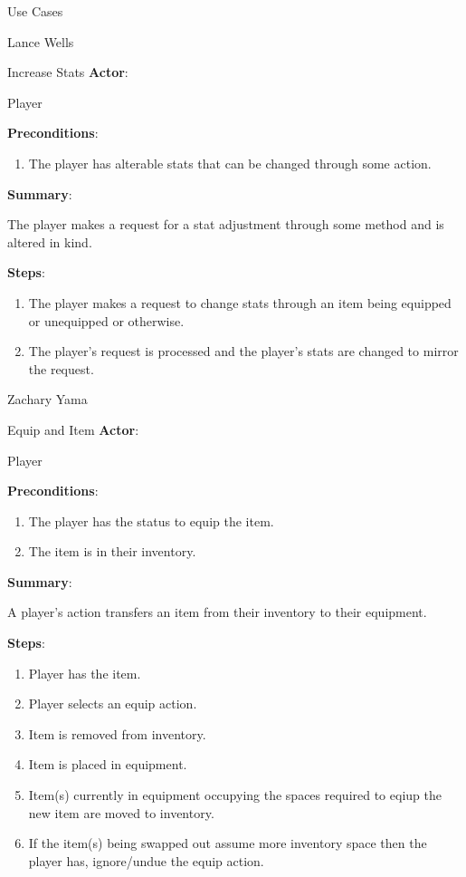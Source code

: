 \documentclass[12pt]{report}
\begin{document}
\begin{section}{Use Cases}
\begin{subsection}{Lance Wells}
\begin{subsubsection}{Increase Stats}
\textbf{Actor}:

Player

\textbf{Preconditions}:

\begin{enumerate}
\item The player has alterable stats that can be changed through some
action.
\end{enumerate}

\textbf{Summary}:

The player makes a request for a stat adjustment through some
method and is altered in kind.

\textbf{Steps}:

\begin{enumerate}
\item The player makes a request to change stats through an item being
equipped or unequipped or otherwise.
\item The player's request is processed and the player's stats are changed
to mirror the request.
\end{enumerate}
\end{subsubsection}
\end{subsection}

\begin{subsection}{Zachary Yama}
\begin{subsubsection}{Equip and Item}
\textbf{Actor}:

Player

\textbf{Preconditions}:
 
\begin{enumerate}
\item The player has the status to equip the item. 
\item The item is in their inventory.
\end{enumerate}

\textbf{Summary}:

A player's action transfers an item from their inventory to their
equipment.

\textbf{Steps}:

\begin{enumerate}
\item Player has the item.
\item Player selects an equip action.
\item Item is removed from inventory.
\item Item is placed in equipment.
\item Item(s) currently in equipment occupying the spaces required to eqiup
the new item are moved to inventory.
\item If the item(s) being swapped out assume more inventory space then the
player has, ignore/undue the equip action.
\end{enumerate}
\end{subsubsection}


\end{subsection}
\end{section}
\end{document}
